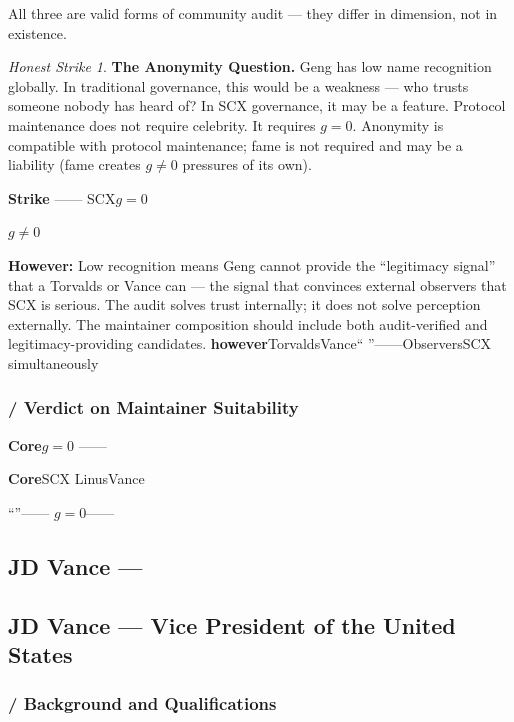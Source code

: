 \documentclass[12pt,a4paper]{article}
\theoremstyle{remark}
\newtheorem{honesthit}{Honest Strike}[section]
\newenvironment{hitbox}{%
  \begin{center}
  \color{critiquered}
  \begin{minipage}{0.92\textwidth}
  \begin{honesthit}
}{%
  \end{honesthit}
  \end{minipage}
  \end{center}
}
\begin{document}
All three are valid forms of community audit — they differ in dimension, not
in existence.

\begin{hitbox}
\textbf{The Anonymity Question.}
Geng has low name recognition globally. In traditional governance, this would
be a weakness — who trusts someone nobody has heard of? In SCX governance, it
may be a feature. Protocol maintenance does not require celebrity. It requires
$g=0$. Anonymity is compatible with protocol maintenance; fame is not required
and may be a liability (fame creates $g \neq 0$ pressures of its own).

\textbf{Strike}
——
SCX$g=0$

$g \neq 0$

\textbf{However:} Low recognition means Geng cannot provide the ``legitimacy
signal'' that a Torvalds or Vance can — the signal that convinces external
observers that SCX is serious. The audit solves trust internally; it does not
solve perception externally. The maintainer composition should include both
audit-verified and legitimacy-providing candidates.
\textbf{however}TorvaldsVance“
”——ObserversSCX
simultaneously
\end{hitbox}

\subsubsection{ / Verdict on Maintainer Suitability}

\begin{verdictbox}
\textbf{Core}$g=0$
——

\textbf{Core}SCX
LinusVance

\textbf{}“”——
$g=0$——
\end{verdictbox}

\newpage

\subsection{JD Vance — }
\subsection{JD Vance — Vice President of the United States}

\subsubsection{ / Background and Qualifications}
\end{document}

